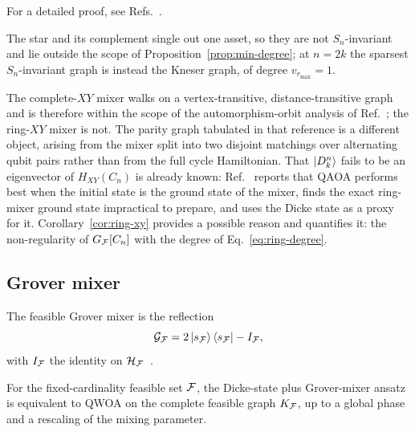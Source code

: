 {For a detailed proof, see Refs.~\cite{FabilaMonroy2012Token,Carballosa2017Regularity}.

\begin{remark}
The star and its complement single out one asset, so they are not $S_n$-invariant and lie outside the scope of Proposition~\ref{prop:min-degree}; at $n=2k$ the sparsest $S_n$-invariant graph is instead the Kneser graph, of degree $v_{r_{\max}}=1$.
\end{remark}

The complete-$XY$ mixer walks on a vertex-transitive, distance-transitive graph and is therefore within the scope of the automorphism-orbit analysis of Ref.~\cite{Matwiejew2024}; the ring-$XY$ mixer is not. The parity graph tabulated in that reference is a different object, arising from the mixer split into two disjoint matchings over alternating qubit pairs rather than from the full cycle Hamiltonian. That $\ket{D^n_k}$ fails to be an eigenvector of $H_{XY}(C_n)$ is already known: Ref.~\cite{He2023} reports that QAOA performs best when the initial state is the ground state of the mixer, finds the exact ring-mixer ground state impractical to prepare, and uses the Dicke state as a proxy for it. Corollary~\ref{cor:ring-xy} provides a possible reason and quantifies it: the non-regularity of $G_{\mathcal{F}}[C_n]$ with the degree of Eq.~\eqref{eq:ring-degree}.

\subsection{\label{subsec:grover}Grover mixer}

The feasible Grover mixer is the reflection
\begin{equation}
\mathcal{G}_{\mathcal{F}} = 2\ket{s_{\mathcal{F}}}\bra{s_{\mathcal{F}}}-I_{\mathcal{F}},
    \label{eq:grover-reflection}
\end{equation}
with $I_{\mathcal{F}}$ the identity on $\mathcal{H}_{\mathcal{F}}$~\cite{Bartschi2020,Bridi2024}.

\begin{proposition}
\label{prop:grover-complete-qwoa}
For the fixed-cardinality feasible set $\mathcal{F}$, the Dicke-state plus Grover-mixer ansatz is equivalent to QWOA on the complete feasible graph $K_{\mathcal{F}}$, up to a global phase and a rescaling of the mixing parameter.
\end{proposition}

}
